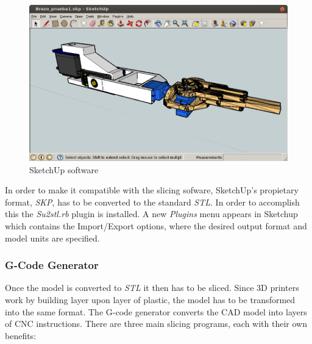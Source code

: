 			\begin{figure}[H]
				\centering
				\includegraphics[scale=0.4]{images/ProjectComponents/sketchup-arm.png}
				\caption{SketchUp software}
				\label{sketchup}
			\end{figure}
			\bigskip

		In order to make it compatible with the slicing sofware, SketchUp's propietary format, \textit{SKP}, has to be converted to the standard \textit{STL}. In order to accomplish this the \textit{Su2stl.rb} plugin is installed. A new \textit{Plugins} menu appears in Sketchup which contains the Import/Export options, where the desired output format and model units are specified.



		\subsubsection{G-Code Generator} 
		Once the model is converted to \textit{STL} it then has to be sliced. Since 3D printers work by building layer upon layer of plastic, the model has to be transformed into the same format. The G-code generator converts the CAD model into layers of CNC instructions. There are three main slicing programs, each with their own benefits:

